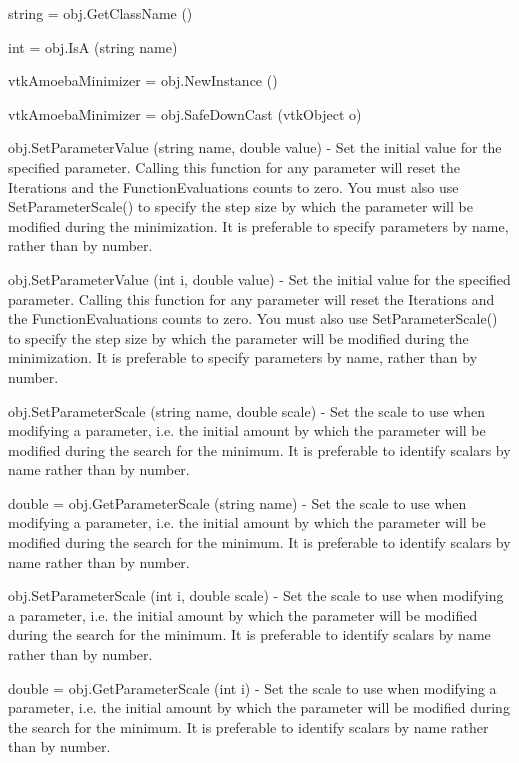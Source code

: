 \begin{DoxyItemize}
\item {\ttfamily string = obj.\-Get\-Class\-Name ()}  
\item {\ttfamily int = obj.\-Is\-A (string name)}  
\item {\ttfamily vtk\-Amoeba\-Minimizer = obj.\-New\-Instance ()}  
\item {\ttfamily vtk\-Amoeba\-Minimizer = obj.\-Safe\-Down\-Cast (vtk\-Object o)}  
\item {\ttfamily obj.\-Set\-Parameter\-Value (string name, double value)} -\/ Set the initial value for the specified parameter. Calling this function for any parameter will reset the Iterations and the Function\-Evaluations counts to zero. You must also use Set\-Parameter\-Scale() to specify the step size by which the parameter will be modified during the minimization. It is preferable to specify parameters by name, rather than by number.  
\item {\ttfamily obj.\-Set\-Parameter\-Value (int i, double value)} -\/ Set the initial value for the specified parameter. Calling this function for any parameter will reset the Iterations and the Function\-Evaluations counts to zero. You must also use Set\-Parameter\-Scale() to specify the step size by which the parameter will be modified during the minimization. It is preferable to specify parameters by name, rather than by number.  
\item {\ttfamily obj.\-Set\-Parameter\-Scale (string name, double scale)} -\/ Set the scale to use when modifying a parameter, i.\-e. the initial amount by which the parameter will be modified during the search for the minimum. It is preferable to identify scalars by name rather than by number.  
\item {\ttfamily double = obj.\-Get\-Parameter\-Scale (string name)} -\/ Set the scale to use when modifying a parameter, i.\-e. the initial amount by which the parameter will be modified during the search for the minimum. It is preferable to identify scalars by name rather than by number.  
\item {\ttfamily obj.\-Set\-Parameter\-Scale (int i, double scale)} -\/ Set the scale to use when modifying a parameter, i.\-e. the initial amount by which the parameter will be modified during the search for the minimum. It is preferable to identify scalars by name rather than by number.  
\item {\ttfamily double = obj.\-Get\-Parameter\-Scale (int i)} -\/ Set the scale to use when modifying a parameter, i.\-e. the initial amount by which the parameter will be modified during the search for the minimum. It is preferable to identify scalars by name rather than by number.  

\end{DoxyItemize}

